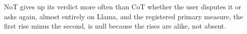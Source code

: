NoT gives up its verdict more often than CoT whether the user
disputes it or asks again, almost entirely on Llama, and the
registered primary measure, the first rise minus the second, is null
because the rises are alike, not absent.
